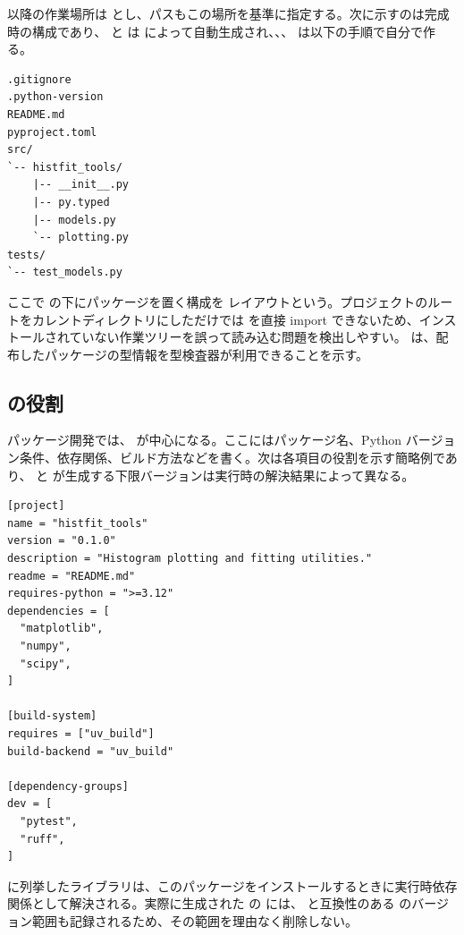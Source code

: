 以降の作業場所は  とし、パスもこの場所を基準に指定する。次に示すのは完成時の構成であり、 と  は  によって自動生成され、、、 は以下の手順で自分で作る。

\begin{lstlisting}[numbers=none, xleftmargin=2\zw, title={histfit\_tools/ の例}]
.gitignore
.python-version
README.md
pyproject.toml
src/
`-- histfit_tools/
    |-- __init__.py
    |-- py.typed
    |-- models.py
    `-- plotting.py
tests/
`-- test_models.py
\end{lstlisting}

ここで  の下にパッケージを置く構成を  レイアウトという。プロジェクトのルートをカレントディレクトリにしただけでは  を直接 import できないため、インストールされていない作業ツリーを誤って読み込む問題を検出しやすい。 は、配布したパッケージの型情報を型検査器が利用できることを示す。

\subsection{ の役割}

パッケージ開発では、 が中心になる。ここにはパッケージ名、Python バージョン条件、依存関係、ビルド方法などを書く。次は各項目の役割を示す簡略例であり、 と  が生成する下限バージョンは実行時の解決結果によって異なる。

\begin{lstlisting}[numbers=none, xleftmargin=2\zw, title={pyproject.toml}]
[project]
name = "histfit_tools"
version = "0.1.0"
description = "Histogram plotting and fitting utilities."
readme = "README.md"
requires-python = ">=3.12"
dependencies = [
  "matplotlib",
  "numpy",
  "scipy",
]

[build-system]
requires = ["uv_build"]
build-backend = "uv_build"

[dependency-groups]
dev = [
  "pytest",
  "ruff",
]
\end{lstlisting}

 に列挙したライブラリは、このパッケージをインストールするときに実行時依存関係として解決される。実際に生成された  の  には、 と互換性のある  のバージョン範囲も記録されるため、その範囲を理由なく削除しない。

